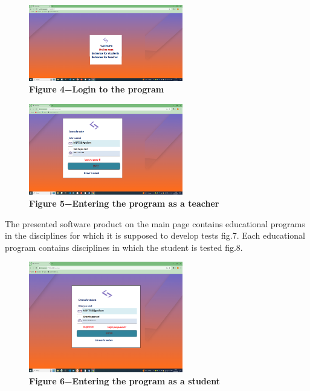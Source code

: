 \begin{figure}[H]
	\centering
	\includegraphics[width=0.6\textwidth]{assets/129}
	\caption*{\bfseries Figure 4−Login to the program}
\end{figure}


\begin{figure}[H]
	\centering
	\includegraphics[width=0.6\textwidth]{assets/130}
	\caption*{\bfseries Figure 5−Entering the program as a teacher}
\end{figure}
\begin{multicols}{2}
	The presented software product on the main page contains educational
	programs in the disciplines for which it is supposed to develop tests fig.7.
	Each educational program contains disciplines in which the student is tested fig.8.
	\end{multicols}


\begin{figure}[H]
	\centering
	\includegraphics[width=0.6\textwidth]{assets/131}
	\caption*{\bfseries Figure 6−Entering the program as a student}
\end{figure}


